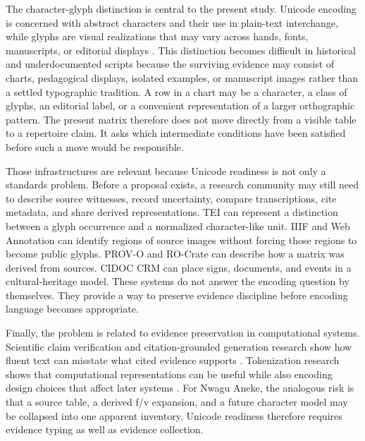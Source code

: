\documentclass[sigconf,nonacm]{acmart}
\begin{document}
The character-glyph distinction is central to the present study. Unicode
encoding is concerned with abstract characters and their use in plain-text
interchange, while glyphs are visual realizations that may vary across hands,
fonts, manuscripts, or editorial displays \cite{unicode17CoreSpec}. This
distinction becomes difficult in historical and underdocumented scripts because
the surviving evidence may consist of charts, pedagogical displays, isolated
examples, or manuscript images rather than a settled typographic tradition. A
row in a chart may be a character, a class of glyphs, an editorial label, or a
convenient representation of a larger orthographic pattern. The present matrix
therefore does not move directly from a visible table to a repertoire claim. It
asks which intermediate conditions have been satisfied before such a move would
be responsible.

Those infrastructures are relevant because Unicode readiness is not only a
standards problem. Before a proposal exists, a research community may still need
to describe source witnesses, record uncertainty, compare transcriptions, cite
metadata, and share derived representations. TEI can represent a distinction
between a glyph occurrence and a normalized character-like unit. IIIF and Web
Annotation can identify regions of source images without forcing those regions
to become public glyphs. PROV-O and RO-Crate can describe how a matrix was
derived from sources. CIDOC CRM can place signs, documents, and events in a
cultural-heritage model. These systems do not answer the encoding question by
themselves. They provide a way to preserve evidence discipline before encoding
language becomes appropriate.

Finally, the problem is related to evidence preservation in computational
systems. Scientific claim verification and citation-grounded generation
research show how fluent text can misstate what cited evidence supports
\cite{wadden2020scifact,gao2023alce}. Tokenization research shows that
computational representations can be useful while also encoding design choices
that affect later systems \cite{sennrich2016bpe,kudo2018sentencepiece,bostrom2020bytepair,rust2021tokenization}.
For Nwagu Aneke, the analogous risk is that a source table, a derived f/v
expansion, and a future character model may be collapsed into one apparent
inventory. Unicode readiness therefore requires evidence typing as well as
evidence collection.
\end{document}
